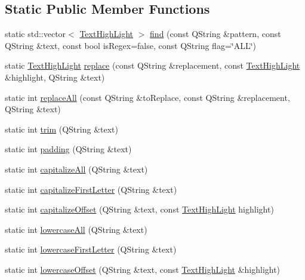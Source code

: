 \subsection*{Static Public Member Functions}
\begin{DoxyCompactItemize}
\item 
static std\+::vector$<$ \hyperlink{class_text_high_light}{Text\+High\+Light} $>$ \hyperlink{class_string_manipulator_adab4023d6e1e822008e3832c56e47d56}{find} (const Q\+String \&pattern, const Q\+String \&text, const bool is\+Regex=false, const Q\+String flag=\char`\"{}A\+LL\char`\"{})
\item 
static \hyperlink{class_text_high_light}{Text\+High\+Light} \hyperlink{class_string_manipulator_a20fdffe83624dbaf91d2f26e79417bed}{replace} (const Q\+String \&replacement, const \hyperlink{class_text_high_light}{Text\+High\+Light} \&highlight, Q\+String \&text)
\item 
static int \hyperlink{class_string_manipulator_a7a77d58ba2445a871cc716a8870f7244}{replace\+All} (const Q\+String \&to\+Replace, const Q\+String \&replacement, Q\+String \&text)
\item 
static int \hyperlink{class_string_manipulator_a254924bbc9bead53372a393aee9f8711}{trim} (Q\+String \&text)
\item 
static int \hyperlink{class_string_manipulator_ac669121dd3e5fda9b8723593fc7ca04d}{padding} (Q\+String \&text)
\item 
static int \hyperlink{class_string_manipulator_ad5ff80ae462045bc6d8f2be32c0da4bb}{capitalize\+All} (Q\+String \&text)
\item 
static int \hyperlink{class_string_manipulator_a0dddee858bb0c58c63fd122645114bcb}{capitalize\+First\+Letter} (Q\+String \&text)
\item 
static int \hyperlink{class_string_manipulator_a236181c606edff1c577a9a88ddb8d7d9}{capitalize\+Offset} (Q\+String \&text, const \hyperlink{class_text_high_light}{Text\+High\+Light} highlight)
\item 
static int \hyperlink{class_string_manipulator_a102944c73c7fc265e426bc7749907e8c}{lowercase\+All} (Q\+String \&text)
\item 
static int \hyperlink{class_string_manipulator_a09536b194993d10f361459873c727c3b}{lowercase\+First\+Letter} (Q\+String \&text)
\item 
static int \hyperlink{class_string_manipulator_ad8075d783befd76e2f456ff1ada8b0f6}{lowercase\+Offset} (Q\+String \&text, const \hyperlink{class_text_high_light}{Text\+High\+Light} \&highlight)

\end{DoxyCompactItemize}
